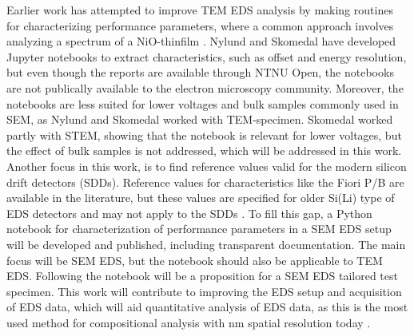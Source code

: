 

Earlier work has attempted to improve TEM EDS analysis by making routines for characterizing performance parameters, where a common approach involves analyzing a spectrum of a NiO-thinfilm \cite{egerton_nio_characterization_1994,ted_pella_nio_tem_2019}.
Nylund \cite{nylund_evaluation_2017} and Skomedal \cite{skomedal_improving_2022} have developed Jupyter notebooks to extract characteristics, such as offset and energy resolution, but even though the reports are available through NTNU Open, the notebooks are not publically available to the electron microscopy community.
Moreover, the notebooks are less suited for lower voltages and bulk samples commonly used in SEM, as Nylund and Skomedal worked with TEM-specimen.
Skomedal worked partly with STEM, showing that the notebook is relevant for lower voltages, but the effect of bulk samples is not addressed, which will be addressed in this work.
Another focus in this work, is to find reference values valid for the modern silicon drift detectors (SDDs).
Reference values for characteristics like the Fiori P/B \cite{fiori_peak_background_1982} are available in the literature, but these values are specified for older Si(Li) type of EDS detectors and may not apply to the SDDs \cite{sdd_lechner_2001}.
To fill this gap, a Python notebook for characterization of performance parameters in a SEM EDS setup will be developed and published, including transparent documentation.
The main focus will be SEM EDS, but the notebook should also be applicable to TEM EDS.
Following the notebook will be a proposition for a SEM EDS tailored test specimen.
This work will contribute to improving the EDS setup and acquisition of EDS data, which will aid quantitative analysis of EDS data, as this is the most used method for compositional analysis with nm spatial resolution today \cite{goldstein_scanning_2018}.



